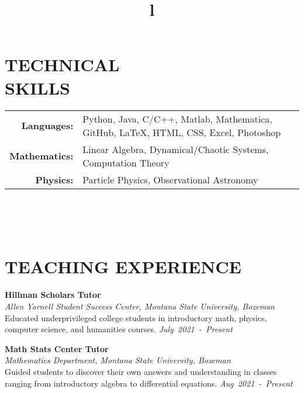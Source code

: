 \documentclass[margin]{res}
\begin{document}
\begin{resume}
\section{TECHNICAL\\SKILLS}

{
\begin{tabular}{r p{9.5cm}}
\textbf{Languages:}   & Python, Java, C/C++, Matlab, Mathematica, GitHub, LaTeX, HTML, CSS, Excel, Photoshop \vspace{0.5ex}\\
\textbf{Mathematics:} & Linear Algebra, Dynamical/Chaotic Systems, Computation Theory \vspace{0.5ex} \\
\textbf{Physics:}     & Particle Physics, Observational Astronomy   \\
\end{tabular}
}


\begin{format}
\title{l}\\
\\
\body\\
\end{format}

\section{TEACHING EXPERIENCE}
\noindent
\textbf{Hillman Scholars Tutor}\\
{\sl Allen Yarnell Student Success Center, Montana State University, Bozeman}\\\vspace{0.5ex}
Educated underprivileged college students in introductory math, physics, computer science, and humanities courses. \hfill
{\sl July~2021~-~Present}

\noindent
\raggedright
\textbf{Math Stats Center Tutor}\\
{\sl Mathematics Department, Montana State University, Bozeman}\\\vspace{0.5ex}
Guided students to discover their own answers and understanding in classes ranging from introductory algebra to differential equations. \hfill
{\sl Aug~2021~-~Present}


\end{resume}
\end{document}
